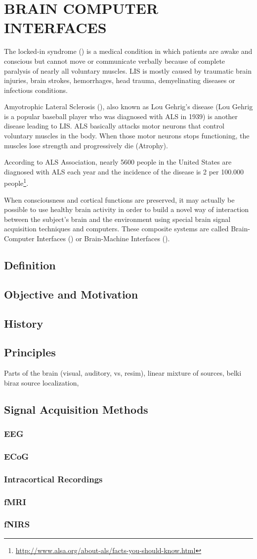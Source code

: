 \documentclass[12pt]{article}
\newcommand\mysection[1]{\vspace*{-0.35cm}\section{#1}\vspace*{6pt}\thispagestyle{empty}}
\newcommand\mysubsection[1]{\subsection{#1}}
\newcommand\mysubsubsection[1]{\subsubsection{#1}}
\numberwithin{equation}{section}
\numberwithin{figure}{section}
\numberwithin{table}{section}
\begin{document}
\mysection{BRAIN COMPUTER INTERFACES}\label{seq:bci}

\par{
    The locked-in syndrome () is a medical condition in which patients are awake and conscious but 
    cannot move or communicate verbally because of complete paralysis of nearly all voluntary muscles. 
    LIS is mostly caused by traumatic brain injuries, brain strokes, hemorrhages, head trauma, demyelinating diseases 
    or infectious conditions.
}


\par {
    Amyotrophic Lateral Sclerosis (), also known as Lou Gehrig's disease (Lou Gehrig is a popular baseball
    player who was diagnosed with ALS in 1939) is another disease leading to LIS. ALS basically attacks
    motor neurons that control voluntary muscles in the body. When those motor neurons stops functioning,
    the muscles lose strength and progressively die (Atrophy).
}

\par {
    According to ALS Association, nearly 5600 people in the United States are 
    diagnosed with ALS each year and the incidence of the disease is 2 per 100.000 
    people\footnote{\url{http://www.alsa.org/about-als/facts-you-should-know.html}}.
}

\par{
    When consciousness and cortical functions are preserved, it may actually be 
    possible to use healthy brain activity in order to build a novel way of interaction 
    between the subject's brain and the environment using special brain signal 
    acquisition techniques and computers. These composite systems are called 
    Brain-Computer Interfaces () or
    Brain-Machine Interfaces ().
}

\mysubsection{Definition}\label{seq:bci_definition}
\mysubsection{Objective and Motivation}\label{seq:bci_motivation}
\mysubsection{History}\label{seq:bci_history}
\mysubsection{Principles}\label{seq:bci_principles}
\par{
Parts of the brain (visual, auditory, vs, resim), linear mixture of sources, belki biraz source localization, 
}

\mysubsection{Signal Acquisition Methods}\label{seq:bci_methods}
\mysubsubsection{EEG}\label{seq:bci_methods_eeg}
\mysubsubsection{ECoG}\label{seq:bci_methods_ecog}
\mysubsubsection{Intracortical Recordings}\label{seq:bci_methods_intracortical}
\mysubsubsection{fMRI}\label{seq:bci_methods_fmri}
\mysubsubsection{fNIRS}\label{seq:bci_methods_fnirs}
\end{document}

